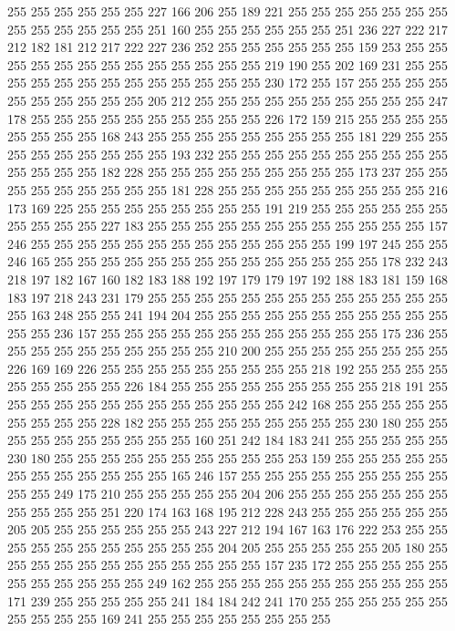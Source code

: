 255 255 255 255 255 255 227 166 206 255 189 221 255 255 255 255 255 255 255 255
255 255 255 255 255 251 160 255 255 255 255 255 255 251 236 227 222 217 212 182
181 212 217 222 227 236 252 255 255 255 255 255 255 159 253 255 255 255 255 255
255 255 255 255 255 255 255 255 219 190 255 202 169 231 255 255 255 255 255 255
255 255 255 255 255 255 255 230 172 255 157 255 255 255 255 255 255 255 255 255
255 205 212 255 255 255 255 255 255 255 255 255 255 247 178 255 255 255 255 255
255 255 255 255 255 226 172 159 215 255 255 255 255 255 255 255 255 168 243 255
255 255 255 255 255 255 255 255 181 229 255 255 255 255 255 255 255 255 255 193
232 255 255 255 255 255 255 255 255 255 255 255 255 255 255 182 228 255 255 255
255 255 255 255 255 255 173 237 255 255 255 255 255 255 255 255 255 181 228 255
255 255 255 255 255 255 255 255 216 173 169 225 255 255 255 255 255 255 255 255
191 219 255 255 255 255 255 255 255 255 255 255 227 183 255 255 255 255 255 255
255 255 255 255 255 255 157 246 255 255 255 255 255 255 255 255 255 255 255 255
255 199 197 245 255 255 246 165 255 255 255 255 255 255 255 255 255 255 255 255
255 255 178 232 243 218 197 182 167 160 182 183 188 192 197 179 179 197 192 188
183 181 159 168 183 197 218 243 231 179 255 255 255 255 255 255 255 255 255 255
255 255 255 255 163 248 255 255 241 194 204 255 255 255 255 255 255 255 255 255
255 255 255 255 236 157 255 255 255 255 255 255 255 255 255 255 255 255 175 236
255 255 255 255 255 255 255 255 255 255 210 200 255 255 255 255 255 255 255 255
226 169 169 226 255 255 255 255 255 255 255 255 255 218 192 255 255 255 255 255
255 255 255 255 226 184 255 255 255 255 255 255 255 255 255 218 191 255 255 255
255 255 255 255 255 255 255 255 255 255 242 168 255 255 255 255 255 255 255 255
255 228 182 255 255 255 255 255 255 255 255 255 230 180 255 255 255 255 255 255
255 255 255 255 160 251 242 184 183 241 255 255 255 255 255 230 180 255 255 255
255 255 255 255 255 255 255 253 159 255 255 255 255 255 255 255 255 255 255 255
255 165 246 157 255 255 255 255 255 255 255 255 255 255 255 249 175 210 255 255
255 255 255 204 206 255 255 255 255 255 255 255 255 255 255 255 251 220 174 163
168 195 212 228 243 255 255 255 255 255 255 205 205 255 255 255 255 255 255 243
227 212 194 167 163 176 222 253 255 255 255 255 255 255 255 255 255 255 255 204
205 255 255 255 255 255 205 180 255 255 255 255 255 255 255 255 255 255 255 255
157 235 172 255 255 255 255 255 255 255 255 255 255 255 249 162 255 255 255 255
255 255 255 255 255 255 255 171 239 255 255 255 255 255 241 184 184 242 241 170
255 255 255 255 255 255 255 255 255 255 169 241 255 255 255 255 255 255 255 255
